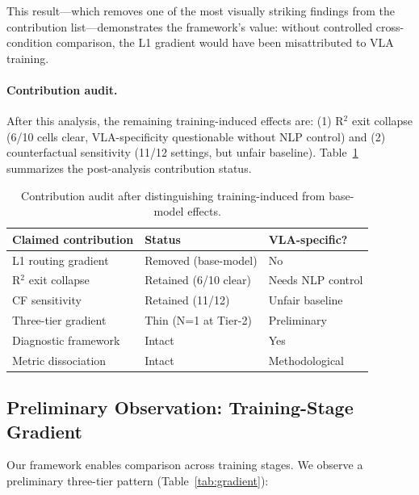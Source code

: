 \documentclass[letterpaper]{article}
\begin{document}
This result---which removes one of the most visually striking findings from the contribution list---demonstrates the framework's value: without controlled cross-condition comparison, the L1 gradient would have been misattributed to VLA training.

\paragraph{Contribution audit.}
After this analysis, the remaining training-induced effects are: (1) R$^2$ exit collapse (6/10 cells clear, VLA-specificity questionable without NLP control) and (2) counterfactual sensitivity (11/12 settings, but unfair baseline).
Table~\ref{tab:audit} summarizes the post-analysis contribution status.

\begin{table}[t]
\centering
\caption{Contribution audit after distinguishing training-induced from base-model effects.}
\label{tab:audit}
\small
\begin{tabular}{lll}
\toprule
\textbf{Claimed contribution} & \textbf{Status} & \textbf{VLA-specific?} \\
\midrule
L1 routing gradient & Removed (base-model) & No \\
R$^2$ exit collapse & Retained (6/10 clear) & Needs NLP control \\
CF sensitivity & Retained (11/12) & Unfair baseline \\
Three-tier gradient & Thin (N=1 at Tier-2) & Preliminary \\
Diagnostic framework & Intact & Yes \\
Metric dissociation & Intact & Methodological \\
\bottomrule
\end{tabular}
\end{table}

\subsection{Preliminary Observation: Training-Stage Gradient}
\label{sec:gradient}

Our framework enables comparison across training stages.
We observe a preliminary three-tier pattern (Table~\ref{tab:gradient}):
\end{document}
